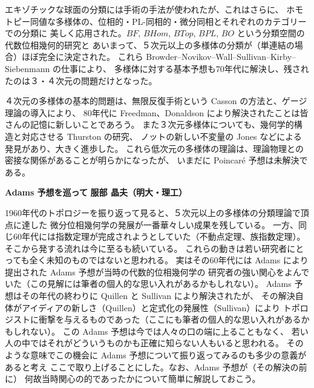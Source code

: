 \documentclass[uplatex,dvipdfmx]{jlreq}
\begin{document}
エキゾチックな球面の分類には手術の手法が使われたが、これはさらに、
ホモトピー同値な多様体の、位相的・PL-同相的・微分同相とそれぞれのカテゴリーでの分類に
美しく応用された。$BF$, $BHom$, $BTop$, $BPL$, $BO$ という分類空間の代数位相幾何的研究と
あいまって、５次元以上の多様体の分類が（単連結の場合）ほぼ完全に決定された。
これら Browder--Novikov--Wall--Sullivan--Kirby--Siebenmann の仕事により、
多様体に対する基本予想も70年代に解決し、残されたのは３・４次元の問題だけとなった。

４次元の多様体の基本的問題は、無限反復手術という Casson の方法と、ゲージ理論の導入により、
80年代に Freedman、Donaldson により解決されたことは皆さんの記憶に新しいことであろう。
また３次元多様体についても、幾何学的構造と対応させる Thurston の研究、
ノットの新しい不変量の Jones などによる発見があり、大きく進歩した。
これら低次元の多様体の理論は、理論物理との密接な関係があることが明らかになったが、
いまだに Poincaré 予想は未解決である。

\newpage

\noindent
{\large\bfseries Adams 予想を巡って}
\hfill
{\large\bfseries 服部 晶夫（明大・理工）}

\medskip

1960年代のトポロジーを振り返って見ると、５次元以上の多様体の分類理論で頂点に達した
微分位相幾何学の発展が一番華々しい成果を残している。
一方、同じ60年代には指数定理が完成されようとしていた（不動点定理、族指数定理）。
そこから発する流れは今に至るも続いている。
これらの動きは若い研究者にとっても全く未知のものではないと思われる。
実はその60年代には Adams により提出された Adams 予想が当時の代数的位相幾何学の
研究者の強い関心をよんでいた（この見解には筆者の個人的な思い入れがあるかもしれない）。
Adams 予想はその年代の終わりに Quillen と Sullivan により解決されたが、
その解決自体がアイディアの新しさ（Quillen）と定式化の発展性（Sullivan）により
トポロジストに衝撃を与えるものであった（ここにも筆者の個人的な思い入れがあるかもしれない）。
この Adams 予想は今では人々の口の端に上ることもなく、
若い人の中ではそれがどういうものかも正確に知らない人もいると思われる。
そのような意味でこの機会に Adams 予想について振り返ってみるのも多少の意義があると考え
ここで取り上げることにした。なお、Adams 予想が（その解決の前に）
何故当時関心の的であったかについて簡単に解説しておこう。
\end{document}
